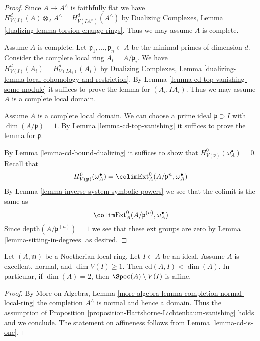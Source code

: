 \begin{proof}
Since $A \to A^\wedge$ is faithfully flat we have
$H^d_{V(I)}(A) \otimes_A A^\wedge = H^d_{V(IA^\wedge)}(A^\wedge)$
by Dualizing Complexes, Lemma \ref{dualizing-lemma-torsion-change-rings}.
Thus we may assume $A$ is complete.

\medskip\noindent
Assume $A$ is complete. Let $\mathfrak p_1, \ldots, \mathfrak p_n \subset A$
be the minimal primes of dimension $d$. Consider the complete local ring
$A_i = A/\mathfrak p_i$. We have $H^d_{V(I)}(A_i) = H^d_{V(IA_i)}(A_i)$
by Dualizing Complexes, Lemma
\ref{dualizing-lemma-local-cohomology-and-restriction}.
By Lemma \ref{lemma-cd-top-vanishing-some-module}
it suffices to prove the lemma for $(A_i, IA_i)$.
Thus we may assume $A$ is a complete local domain.

\medskip\noindent
Assume $A$ is a complete local domain. We can choose a prime ideal
$\mathfrak p \supset I$ with $\dim(A/\mathfrak p) = 1$.
By Lemma \ref{lemma-cd-top-vanishing}
it suffices to prove the lemma for $\mathfrak p$.

\medskip\noindent
By Lemma \ref{lemma-cd-bound-dualizing} it suffices to show that
$H^0_{V(\mathfrak p)}(\omega_A^\bullet) = 0$.
Recall that
$$
H^0_{V(\mathfrak p)}(\omega_A^\bullet) =
\colim \text{Ext}^0_A(A/\mathfrak p^n, \omega_A^\bullet)
$$
By Lemma \ref{lemma-inverse-system-symbolic-powers}
we see that the colimit is the same as
$$
\colim \text{Ext}^0_A(A/\mathfrak p^{(n)}, \omega_A^\bullet)
$$
Since $\text{depth}(A/\mathfrak p^{(n)}) = 1$ we see that
these ext groups are zero by Lemma \ref{lemma-sitting-in-degrees}
as desired.
\end{proof}

\begin{lemma}
\label{lemma-affine-complement}
Let $(A, \mathfrak m)$ be a Noetherian local ring.
Let $I \subset A$ be an ideal. Assume $A$ is excellent,
normal, and $\dim V(I) \geq 1$. Then $\text{cd}(A, I) < \dim(A)$.
In particular, if $\dim(A) = 2$, then $\Spec(A) \setminus V(I)$ is affine.
\end{lemma}

\begin{proof}
By More on Algebra, Lemma
\ref{more-algebra-lemma-completion-normal-local-ring}
the completion $A^\wedge$ is normal and hence a domain.
Thus the assumption of
Proposition \ref{proposition-Hartshorne-Lichtenbaum-vanishing}
holds and we conclude. The statement on affineness
follows from Lemma \ref{lemma-cd-is-one}.
\end{proof}

















